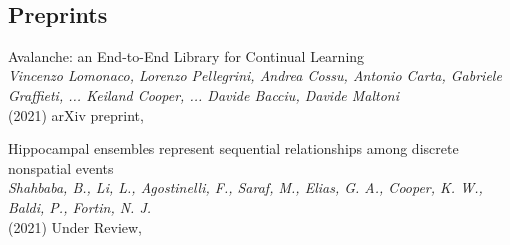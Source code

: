 \documentclass[10pt]{cooperCV2}
\begin{document}

\needspace{\headerpush}
\myRule{\columnwidth}{1pt}\\

 
 
	

\subsection{Preprints} 
\begin{etaremune}[itemindent=-\bibhang, topsep=0pt,
				   itemsep=\bibsep,partopsep=0pt,parsep=0pt,leftmargin={\bibhang+\widthof{[999]}}] 
    
    \item Avalanche: an End-to-End Library for Continual Learning \\
     \textit{Vincenzo Lomonaco, Lorenzo Pellegrini, Andrea Cossu, Antonio Carta, Gabriele Graffieti, ... Keiland Cooper, ... Davide Bacciu, Davide Maltoni}\\
     (2021) arXiv preprint, 
     
	
    \item Hippocampal ensembles represent sequential relationships among discrete nonspatial events \\
     \textit{Shahbaba, B., Li, L., Agostinelli, F., Saraf, M., Elias, G. A., Cooper, K. W., Baldi, P.,  Fortin, N. J.}\\
     (2021) Under Review, 
     
	

\end{etaremune}

 

	
\end{document}
